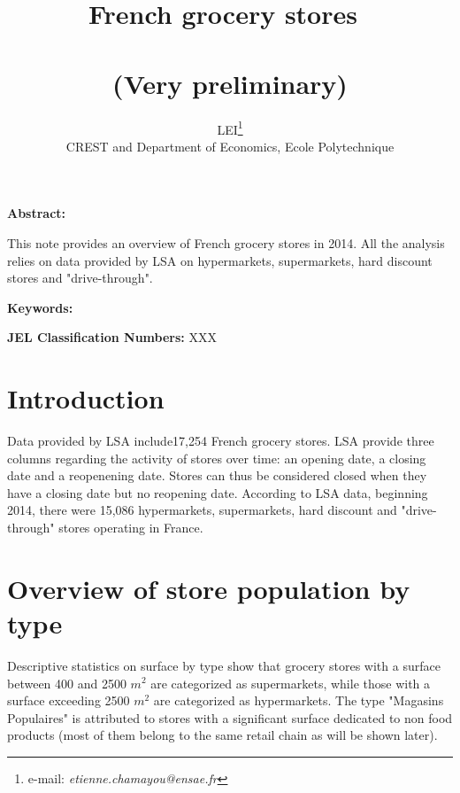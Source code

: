 \documentclass[11pt]{article}
\begin{document}
\title{French grocery stores\ \\ \ \\(Very preliminary)}
\author{LEI\thanks{e-mail:
\textit{etienne.chamayou@ensae.fr}}\medskip\\{\normalsize CREST and Department of Economics, Ecole Polytechnique }}
\maketitle

\sloppy%

\onehalfspacing

\textbf{Abstract:}

This note provides an overview of French grocery stores in 2014. All the analysis relies on data provided by LSA on hypermarkets, supermarkets, hard discount stores and "drive-through".

\strut

\textbf{Keywords:}

\strut

\textbf{JEL Classification Numbers:} XXX

\pagebreak%
\doublespacing

\section{Introduction}

Data provided by LSA include17,254 French grocery stores. LSA provide three columns regarding the activity of stores over time: an opening date, a closing date and a reopenening date. Stores can thus be considered closed when they have a closing date but no reopening date. According to LSA data, beginning 2014, there were 15,086 hypermarkets, supermarkets, hard discount and "drive-through" stores operating in France.



\section{Overview of store population by type}


Descriptive statistics on surface by type show that grocery stores with a surface between 400 and 2500 $m^2$ are categorized as supermarkets, while those with a surface exceeding 2500 $m^2$ are categorized as hypermarkets. The type "Magasins Populaires" is attributed to stores with a significant surface dedicated to non food products (most of them belong to the same retail chain as will be shown later).
\end{document}
